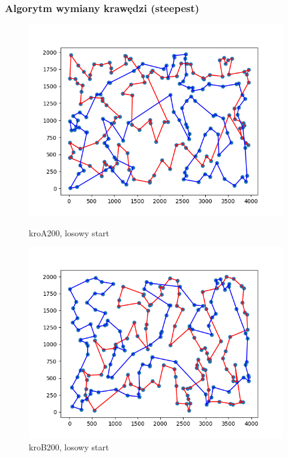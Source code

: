 \documentclass[11pt]{article}
\begin{document}
\subsubsection{Algorytm wymiany krawędzi (steepest)}
\begin{figure}[H]
    \centering
    \begin{minipage}[t]{0.45\textwidth}
        \centering
        \includegraphics[width=\linewidth]{best_paths/kroA200/traverse_steepest_edge/randomstart}
        \caption{kroA200, losowy start}
    \end{minipage}
    \hfill
    \begin{minipage}[t]{0.45\textwidth}
        \centering
        \includegraphics[width=\linewidth]{best_paths/kroB200/traverse_steepest_edge/randomstart}
        \caption{kroB200, losowy start}
    \end{minipage}


\end{figure}
\end{document}
